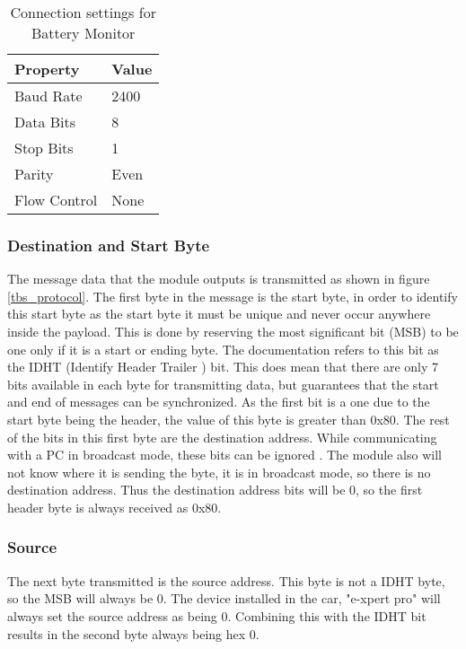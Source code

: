 \begin{table}
\begin{center}
    \begin{tabular}{|l|l|}
        \hline
        Property & Value \\ \hline
        Baud Rate    & 2400 \\
        Data Bits    & 8    \\ 
        Stop Bits    & 1    \\ 
        Parity       & Even \\ 
        Flow Control & None \\
        \hline
    \end{tabular}
	\caption{Connection settings for Battery Monitor}
\end{center}
\end{table}


\subsubsection{Destination and Start Byte}
\label{sec:expertprotocol}

The message data that the module outputs is transmitted as shown in figure \ref{tbs_protocol}. The first byte in the message is the start byte, in order to identify this start byte as the start byte it must be unique and never occur anywhere inside the payload. This is done by reserving the most significant bit (MSB) to be one only if it is a start or ending byte. The documentation refers to this bit as the IDHT (Identify Header Trailer ) bit. This does mean that there are only 7 bits available in each byte for transmitting data, but guarantees that the start and end of messages can be synchronized. As the first bit is a one due to the start byte being the header, the value of this byte is greater than 0x80. The rest of the bits in this first byte are the destination address. While communicating with a PC in broadcast mode, these bits can be ignored \cite{e_xpert}. The module also will not know where it is sending the byte, it is in broadcast mode, so there is no destination address. Thus the destination address bits will be 0, so the first header byte is always received as 0x80.

\subsubsection{Source}

The next byte transmitted is the source address. This byte is not a IDHT byte, so the MSB will always be 0. The device installed in the car, "e-xpert pro" will always set the source address as being 0. Combining this with the IDHT bit results in the second byte always being hex 0.

